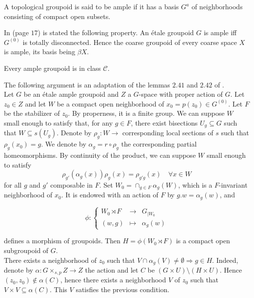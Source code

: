 \begin{definition}
A topological groupoid is said to be ample if it has a basis $G^a$ of neighborhoods consisting of compact open subsets.
\end{definition}

In \cite{paterson} (page $17$) is stated the following property. An étale groupoid $G$ is ample iff $G^{(0)}$ is totally disconnected. Hence the coarse groupoid of every coarse space $X$ is ample, its basis being $\beta X$.

\begin{prop}
Every ample groupoid is in class $\mathcal C$.
\end{prop}

\begin{dem} The following argument is an adaptation of the lemmas $2.41$ and $2.42$ of \cite{TuNonHaus}.\\%

Let $G$ be an étale ample groupoid and $Z$ a $G$-space with proper action of $G$. Let $z_0\in Z$ and let $W$ be a compact open neighborhood of $x_0=p(z_0)\in G^{(0)}$. Let $F$ be the stabilizer of $z_0$. By properness, it is a finite group. We can suppose $W$ small enough to satisfy that, for any $g\in F$, there exist bisections $U_g \subseteq G$ such that $W \subseteq s(U_g)$. Denote by $\rho_g : W\rightarrow$ corresponding local sections of $s$ such that $\rho_g(x_0)=g$. We denote by $\alpha_g =r\circ \rho_g$ the corresponding partial homeomorphisms. By continuity of the product, we can suppose $W$ small enough to satisfy 
\[\rho_{g'}(\alpha_g(x))\rho_g(x) = \rho_{g'g}(x) \quad\forall x\in W\]
for all $g$ and $g'$ composable in $F$. Set $W_0 = \cap_{g\in F}\alpha_g(W)$, which is a $F$-invariant neighborhood of $x_0$. It is endowed with an action of $F$ by $g.w=\alpha_g(w)$, and 

\[\phi : \left\{ \begin{array}{rcl}
W_0\rtimes F & \rightarrow & G_{|W_0} \\ 
(w,g) & \mapsto & \alpha_g(w) \end{array}\right.\] 

defines a morphism of groupoids. Then $H= \phi(W_0\rtimes F)$ is a compact open subgroupoid of $G$.\\

There exists a neighborhood of $z_0$ such that $V\cap \alpha_g(V) \neq \emptyset \Rightarrow g\in H$. Indeed, denote by $\alpha : G\times_{s,p} Z\rightarrow Z$ the action and let $C$ be  $(G\times U) \setminus (H\times U)$. Hence $(z_0,z_0)\notin \alpha(C)$, hence there exists a neighborhood $V$ of $z_0$ such that $V\times V \subseteq \alpha(C)$. This $V$ satisfies the previous condition. \\


\end{dem}
